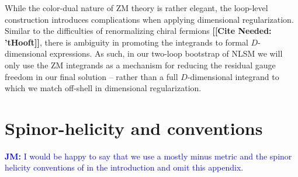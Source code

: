 \documentclass[11pt,letter]{article}
\newcommand{\jm}[1]{\textcolor{blue}{\textbf{JM: }{#1}}}
\newcommand{\citepls}[1]{{\bf\color{red}[[Cite Needed: #1]]}}
\begin{document}
While the color-dual nature of ZM theory is rather elegant, the loop-level construction introduces complications when applying dimensional regularization. Similar to the difficulties of renormalizing chiral fermions \citepls{ 'tHooft}, there is ambiguity in promoting the integrands to formal $D$-dimensional expressions. As such, in our two-loop bootstrap of NLSM we will only use the ZM integrands as a mechanism for reducing the residual gauge freedom in our final solution -- rather than a full $D$-dimensional integrand to which we match off-shell in dimensional regularization.

\section{Spinor-helicity and conventions}\label{Conventions}
\jm{I would be happy to say that we use a mostly minus metric and the spinor helicity conventions of \cite{jjmcTASI2014} in the introduction and omit this appendix.}
\end{document}
